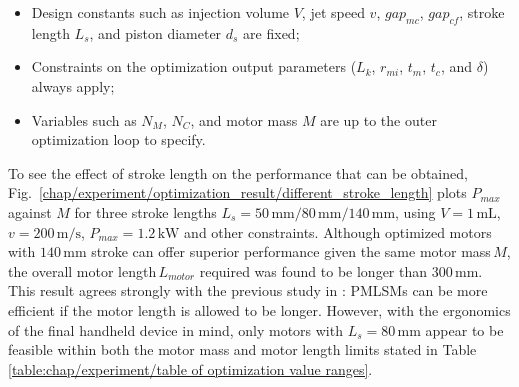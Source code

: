     
    \begin{itemize}
    \item Design constants such as injection volume $V$, jet speed $v$, $gap_{mc}$, $gap_{cf}$, stroke length $L_s$, and piston diameter $d_s$ are fixed;
    \item Constraints on the optimization output parameters ($L_k$, $r_{mi}$, $t_m$, $t_c$, and $\delta$) always apply;
    \item Variables such as $N_M$, $N_C$, and motor mass $M$ are up to the outer optimization loop to specify.
    \end{itemize}
    
    
    To see the effect of stroke length on the performance that can be obtained, Fig.~\ref{chap/experiment/optimization_result/different_stroke_length} plots $P_{max}$ against $M$ for three stroke lengths $L_s=50\,\mathrm{mm}/80\,\mathrm{mm}/140\,\mathrm{mm}$, using $V = 1\,\mathrm{mL}$, $v = 200\,\mathrm{m/s}$,  $P_{max} = 1.2\,\mathrm{kW}$ and other constraints. Although optimized motors with $140\,\mathrm{mm}$ stroke can offer superior performance given the same motor mass\,$M$, the overall motor length\,$L_{motor}$ required was found to be longer than $300\,\mathrm{mm}$. This result agrees strongly with the previous study in \cite{Ruddy2015a}: \acsp{PMLSM} can be more efficient if the motor length is allowed to be longer. However, with the ergonomics of the final handheld device in mind, only motors with $L_s = 80\,\mathrm{mm}$ appear to be feasible within both the motor mass and motor length limits stated in Table\,\ref{table:chap/experiment/table of optimization value ranges}. 
    
